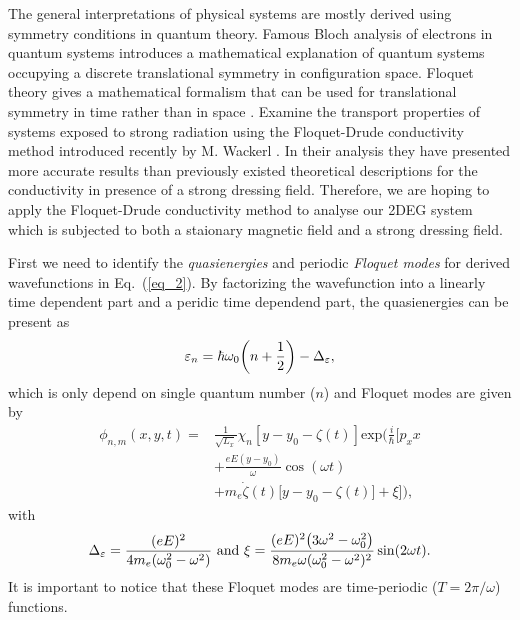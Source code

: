 The general interpretations of physical systems are mostly derived using symmetry conditions in quantum theory. Famous Bloch analysis of electrons in quantum systems introduces a mathematical explanation of quantum systems occupying a discrete translational symmetry in configuration space. Floquet theory gives a mathematical formalism that can be used for translational symmetry in time rather than in space \cite{floquet83,grifoni98,holthaus15}. Examine the transport properties of systems exposed to strong radiation using the Floquet-Drude conductivity method introduced recently by M. Wackerl \cite{wackerl20}. In their analysis they have presented more accurate results than previously existed theoretical descriptions for the conductivity in presence of a strong dressing field. Therefore, we are hoping to apply the Floquet-Drude conductivity method to analyse our 2DEG system which is subjected to both a staionary magnetic field and a strong dressing field.

First we need to identify the \textit{quasienergies} and periodic \textit{Floquet modes} for derived wavefunctions in Eq.~(\ref{eq_2}). By factorizing the wavefunction into a linearly time dependent part and a peridic time dependend part, the quasienergies can be present as
\begin{equation} \label{eq_6}
  \varepsilon_{n} =
  \hbar \omega_0\qty(n + \frac{1}{2}) - \Delta_{\varepsilon},
\end{equation}
which is only depend on single quantum number ($n$) and Floquet modes are given by
\begin{equation} \label{eq_7}
  \begin{aligned}
    \phi_{n,m}(x,y,t) = &
    \frac{1}{\sqrt{L_x}} \chi_{n}\left[y - y_0 - \zeta(t)\right]
    \text{exp}\bigg(
     \frac{i}{\hbar}\bigg[
     p_x x \\
     & +
     \frac{eE(y - y_0)}{\omega}\cos(\omega t) \\
     & +
     m_e\dot{\zeta}(t)\big[y - y_0 -\zeta(t)\big]
     + \xi \bigg]\bigg),
  \end{aligned}
\end{equation}
with
\begin{equation} \label{eq_8}
  \Delta_{\varepsilon} = \frac{(eE)^2}{4m_e(\omega_0^2 - \omega^2)} ~ \text{and} ~
  \xi = \frac{(eE)^2\qty(3\omega^2 - \omega_0^2)}{8m_e\omega(\omega_0^2 - \omega^2)^2} \sin(2\omega t).
\end{equation}
It is important to notice that these Floquet modes are time-periodic ($T=2\pi/\omega$) functions.


